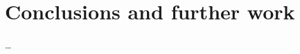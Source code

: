 \documentclass{masterthesis}
\begin{document}


\chapter{Conclusions and further work}
\dots

\nocite{*}



\appendix








\end{document}
